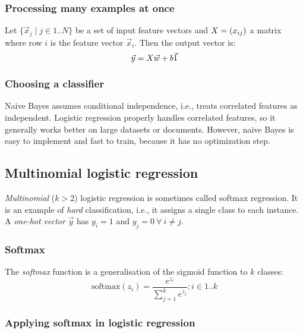 \subsubsection{Processing many examples at once}

Let $\{ \vec{x}_j \mid j \in 1 .. N \}$ be a set of input feature vectors and
$X = (x_{ij})$ a matrix where row $i$ is the feature vector $\vec{x}_i$.
Then the output vector is:
\begin{equation}
  \vec{y} = X \vec{w} + b \vec{1}
\end{equation}

\subsubsection{Choosing a classifier}

Naive Bayes assumes conditional independence, i.e., treats correlated features
as independent.
Logistic regression properly handles correlated features, so it generally works
better on large datasets or documents.
However, naive Bayes is easy to implement and fast to train, because it has no
optimization step.

\subsection{Multinomial logistic regression}

\textit{Multinomial} ($k > 2$) logistic regression is sometimes called softmax regression.
It is an example of \textit{hard} classification, i.e., it assigns a single
class to each instance.
A \textit{one-hot vector} $\vec{y}$ has $y_i = 1$ and $y_j = 0\ \forall\ i \neq
  j$.

\subsubsection{Softmax}

The \textit{softmax} function is a generalisation of the sigmoid function to $k$ classes:
\begin{equation}
  \label{eqnSoftmax}
  \text{softmax}(z_i) = \frac{e^{z_i}}{\sum_{j = 1}^{k} e^{z_j}} : i \in 1 .. k
\end{equation}

\subsubsection{Applying softmax in logistic regression}

